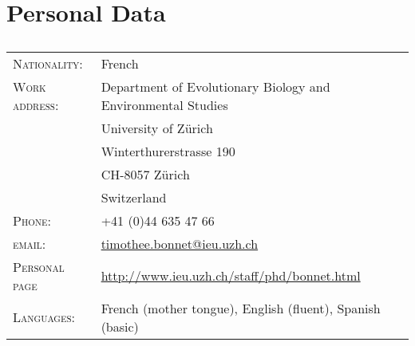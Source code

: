 \documentclass[a4paper,oneside,10pt]{article} %
\begin{document}
\pagestyle{empty} %

\par{}

\section*{Personal Data}
\subsection*{}
\begin{tabular}{p{4cm} p{11cm}}
\hfill \textsc{Nationality:} & French\\
\hfill \textsc{Work address:} & Department of Evolutionary Biology and Environmental Studies\\ 
									& University of Z\"{u}rich\\
									& Winterthurerstrasse 190\\
									& CH-8057 Z\"{u}rich\\
									& Switzerland \\
\hfill \textsc{Phone:} & +41 (0)44 635 47 66\\
\hfill \textsc{email:} & \href{mailto:timothee.bonnet@ieu.uzh.ch}{timothee.bonnet@ieu.uzh.ch}\\
\hfill \textsc{Personal page} & \url{http://www.ieu.uzh.ch/staff/phd/bonnet.html} \\
\hfill \textsc{Languages:} & French (mother tongue), English (fluent), Spanish (basic)
\end{tabular}
\end{document}
